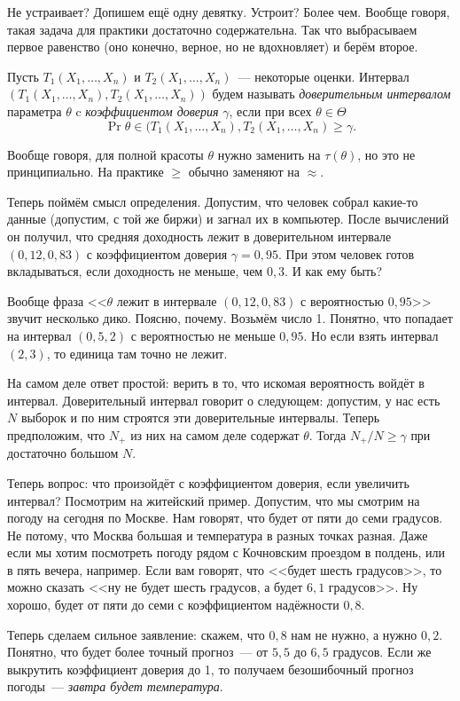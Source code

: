 Не устраивает? Допишем ещё одну девятку. Устроит? Более чем. Вообще говоря, 
такая задача для практики достаточно содержательна. Так что выбрасываем первое 
равенство (оно конечно, верное, но не вдохновляет) и берём второе.

\begin{definition}
	Пусть \(T_{1}(X_{1}, \dots, X_{n})\) и \(T_{2}(X_{1}, \dots, X_{n})\)~--- 
	некоторые оценки. Интервал \((T_{1}(X_{1}, \dots, X_{n}), T_{2}(X_{1}, 
	\dots, X_{n}))\) будем называть \emph{доверительным интервалом} параметра 
	\(\theta\) c \emph{коэффициентом доверия} \(\gamma\), если при всех 
	\(\theta \in \Theta\)
	\[
		\Pr{\theta \in (T_{1}(X_{1}, \dots, X_{n}), T_{2}(X_{1}, \dots, X_{n})} 
		\geq \gamma.
	\]
\end{definition}
\begin{remark}
	Вообще говоря, для полной красоты \(\theta\) нужно заменить на 
	\(\tau(\theta)\), но это не принципиально. На практике \(\geq\) обычно 
	заменяют на \(\approx\).
\end{remark}

Теперь поймём смысл определения. Допустим, что человек собрал какие-то данные 
(допустим, с той же биржи) и загнал их в компьютер. После вычислений он 
получил, что средняя доходность лежит в доверительном интервале \((0,12, 
0,83)\) с коэффициентом доверия \(\gamma = 0,95\). При этом человек готов 
вкладываться, если доходность не меньше, чем \(0,3\). И как ему быть?

Вообще фраза <<\(\theta\) лежит в интервале \((0,12, 0,83)\) с вероятностью 
\(0,95\)>> звучит несколько дико. Поясню, почему. Возьмём число 1. Понятно, что 
попадает на интервал \((0,5, 2)\) с вероятностью не меньше \(0,95\). Но если 
взять интервал \((2, 3)\), то единица там точно не лежит.

На самом деле ответ простой: верить в то, что искомая вероятность войдёт в 
интервал. Доверительный интервал говорит о следующем: допустим, у нас есть 
\(N\) выборок и по ним строятся эти доверительные интервалы. Теперь 
предположим, что \(N_{+}\) из них на самом деле содержат \(\theta\). Тогда 
\(N_{+}/N \geq \gamma\) при достаточно большом \(N\).

Теперь вопрос: что произойдёт с коэффициентом доверия, если увеличить интервал? 
Посмотрим на житейский пример. Допустим, что мы смотрим на погоду на сегодня по 
Москве. Нам говорят, что будет от пяти до семи градусов. Не потому, что Москва 
большая и температура в разных точках разная. Даже если мы хотим посмотреть 
погоду рядом с Кочновским проездом в полдень, или в пять вечера, например. Если 
вам говорят, что <<будет шесть градусов>>, то можно сказать <<ну не будет шесть 
градусов, а будет \(6,1\) градусов>>. Ну хорошо, будет от пяти до семи с 
коэффициентом надёжности \(0,8\).

Теперь сделаем сильное заявление: скажем, что \(0,8\) нам не нужно, а нужно 
\(0,2\). Понятно, что будет более точный прогноз~--- от \(5,5\) до \(6,5\) 
градусов. Если же выкрутить коэффициент доверия до 1, то получаем безошибочный 
прогноз погоды~--- \emph{завтра будет температура}. 